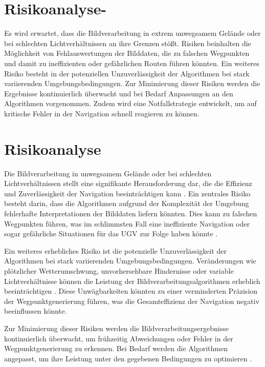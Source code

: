 \section{Risikoanalyse-}

Es wird erwartet, dass die Bildverarbeitung in extrem unwegsamem Gelände oder bei schlechten Lichtverhältnissen an ihre Grenzen stößt. 
Risiken beinhalten die Möglichkeit von Fehlauswertungen der Bilddaten, die zu falschen Wegpunkten und damit zu ineffizienten oder gefährlichen Routen führen könnten. 
Ein weiteres Risiko besteht in der potenziellen Unzuverlässigkeit der Algorithmen bei stark variierenden Umgebungsbedingungen. 
Zur Minimierung dieser Risiken werden die Ergebnisse kontinuierlich überwacht und bei Bedarf Anpassungen an den Algorithmen vorgenommen. 
Zudem wird eine Notfallstrategie entwickelt, um auf kritische Fehler in der Navigation schnell reagieren zu können.


\section{Risikoanalyse}

Die Bildverarbeitung in unwegsamem Gelände oder bei schlechten Lichtverhältnissen stellt eine signifikante Herausforderung dar, die die Effizienz und Zuverlässigkeit der Navigation beeinträchtigen kann \cite{mapless:ugv:navigation}. 
Ein zentrales Risiko besteht darin, dass die Algorithmen aufgrund der Komplexität der Umgebung fehlerhafte Interpretationen der Bilddaten liefern könnten. 
Dies kann zu falschen Wegpunkten führen, was im schlimmsten Fall eine ineffiziente Navigation oder sogar gefährliche Situationen für das \ac{UGV} zur Folge haben könnte \cite{ugv:coverage:energy:efficient}.
    
Ein weiteres erhebliches Risiko ist die potenzielle Unzuverlässigkeit der Algorithmen bei stark variierenden Umgebungsbedingungen. Veränderungen wie plötzlicher Wetterumschwung, unvorhersehbare Hindernisse oder variable Lichtverhältnisse können die Leistung der Bildverarbeitungsalgorithmen erheblich beeinträchtigen \cite{autonomous:flight:uwb:positioning}. 
Diese Unwägbarkeiten könnten zu einer verminderten Präzision der Wegpunktgenerierung führen, was die Gesamteffizienz der Navigation negativ beeinflussen könnte.

Zur Minimierung dieser Risiken werden die Bildverarbeitungsergebnisse kontinuierlich überwacht, um frühzeitig Abweichungen oder Fehler in der Wegpunktgenerierung zu erkennen. 
Bei Bedarf werden die Algorithmen angepasst, um ihre Leistung unter den gegebenen Bedingungen zu optimieren \cite{image:processing:uav:autonomous}.
